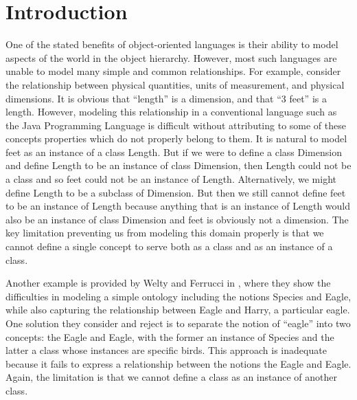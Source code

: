 \documentclass{acm-sigplan}
\begin{document}
\section{Introduction}
One of the stated benefits of object-oriented languages is their
ability to model aspects of the world in the object hierarchy.
However, most such languages are unable to model many simple and
common relationships. For example, consider the relationship between
physical quantities, units of measurement, and physical dimensions. It
is obvious that ``length'' is a dimension, and that ``3 feet'' is a
length.  However, modeling this relationship in a conventional
language such as the Java Programming Language is difficult without
attributing to some of these concepts properties which do not properly
belong to them.  It is natural to model { feet} as an instance
of a class {\txt Length}. But if we were to define a class {\txt
Dimension} and define {\txt Length} to be an instance of class {\txt
Dimension}, then {\txt Length} could not be a class and so {
feet} could not be an instance of {\txt Length}. Alternatively, we
might define {\txt Length} to be a subclass of {\txt Dimension}. But
then we still cannot define { feet} to be an instance of {\txt
Length} because anything that is an instance of {\txt Length} would
also be an instance of class {\txt Dimension} and { feet} is
obviously not a dimension. The key limitation preventing us from
modeling this domain properly is that we cannot define a single
concept to serve both as a class and as an instance of a class.

Another example is provided by Welty and Ferrucci in \cite{FW96}, where
they show the difficulties in modeling a simple
ontology including the notions {\txt Species} and {\txt Eagle}, while
also capturing the relationship between {\txt Eagle} and {\txt Harry},
a particular eagle.  One solution they consider and reject is to
separate the notion of ``eagle'' into two concepts: {\txt the Eagle}
and {\txt Eagle}, with the former an instance of {\txt Species} and
the latter a class whose instances are specific birds.  This approach
is inadequate because it fails to express a relationship between the
notions {\txt the Eagle} and {\txt Eagle}.
Again, the limitation is that we cannot define a class as an instance of another class.
\end{document}
